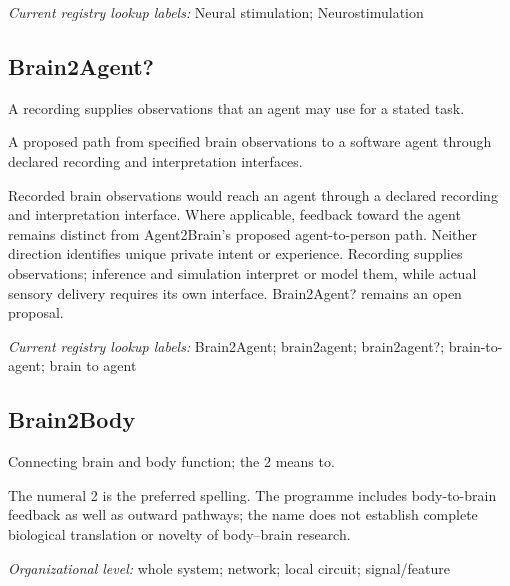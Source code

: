 \noindent\textit{Current registry lookup labels:} Neural stimulation; Neurostimulation\par

\begin{samepage}
\subsection*{Brain2Agent?}
\noindent A recording supplies observations that an agent may use for a stated task.\par
\end{samepage}
\noindent A proposed path from specified brain observations to a software agent through declared recording and interpretation interfaces.\par
\begin{samepage}
\noindent Recorded brain observations would reach an agent through a declared recording and interpretation interface. Where applicable, feedback toward the agent remains distinct from Agent2Brain’s proposed agent-to-person path. Neither direction identifies unique private intent or experience. Recording supplies observations; inference and simulation interpret or model them, while actual sensory delivery requires its own interface. Brain2Agent? remains an open proposal.\par\nopagebreak[4]

\end{samepage}


\noindent\textit{Current registry lookup labels:} Brain2Agent; brain2agent; brain2agent?; brain-to-agent; brain to agent\par

\begin{samepage}
\subsection*{Brain2Body}
\noindent Connecting brain and body function; the 2 means to.\par
\end{samepage}
\noindent The numeral 2 is the preferred spelling. The programme includes body-to-brain feedback as well as outward pathways; the name does not establish complete biological translation or novelty of body–brain research.\par
\begin{samepage}
\noindent\textit{Organizational level:} whole system; network; local circuit; signal/feature\par\nopagebreak[4]

\end{samepage}


